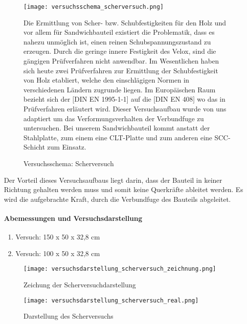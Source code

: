 \documentclass[12 pt,a4 paper ]{scrreprt}
\begin{document}
\begin{figure}
\begin{minipage}[hbt]{8cm}
	\texttt{[image: versuchsschema\_scherversuch.png]}
	\caption{Versuchsschema: Scherversuch }
	\label{versuchsschema_scherversuch}
\end{minipage}
\hfill
\begin{minipage}[hbt]{8cm}
Die Ermittlung von Scher- bzw. Schubfestigkeiten für den Holz und vor allem für  Sandwichbauteil existiert die Problematik, dass es nahezu unmöglich ist, einen reinen Schubspannungszustand zu erzeugen. Durch die geringe innere Festigkeit des Velox, sind die gängigen Prüfverfahren nicht anwendbar. 
Im Wesentlichen haben sich heute zwei Prüfverfahren zur Ermittlung der Schubfestigkeit von Holz etabliert, welche den einschlägigen Normen in verschiedenen Ländern zugrunde liegen. Im Europäischen Raum bezieht sich der [DIN EN 1995-1-1] auf die [DIN EN 408] wo das in Prüfverfahren erläutert wird. Dieser Versuchsaufbau wurde von uns adaptiert um das Verformungsverhalten der Verbundfuge zu untersuchen. Bei unserem Sandwichbauteil kommt anstatt der Stahlplatte, zum einem eine CLT-Platte und zum anderen eine SCC-Schicht zum Einsatz.

\end{minipage}
\end{figure}

\clearpage{}

Der Vorteil dieses Versuchsaufbaus liegt darin, dass der Bauteil in keiner Richtung gehalten werden muss und somit keine Querkräfte ableitet werden. Es wird die aufgebrachte Kraft, durch die Verbundfuge des Bauteils abgeleitet.

\paragraph{Abemessungen und Versuchsdarstellung}





\begin{enumerate}
\item Versuch: 150 x 50 x 32,8 cm
\item Versuch: 100 x 50 x 32,8 cm
\end{enumerate}

\begin{figure}
\begin{minipage}[hbt]{7cm}	
	\texttt{[image: versuchsdarstellung\_scherversuch\_zeichnung.png]}
	\caption{Zeichung der Scherversuchdarstellung}
	\label{Zeichung der Scherversuchdarstellung}
\end{minipage}
\hfill
\begin{minipage}[hbt]{7cm}
	\texttt{[image: versuchsdarstellung\_scherversuch\_real.png]}
	\caption{Darstellung des Scherversuchs}
	\label{Darstellung des Scherversuchs}
\end{minipage}
\end{figure}
\end{document}
